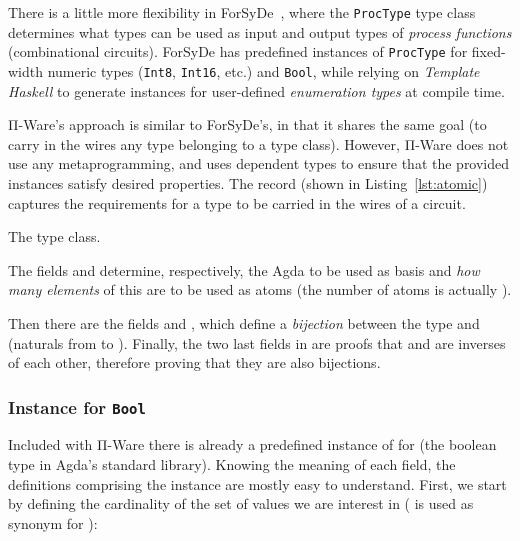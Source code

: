             There is a little more flexibility in ForSyDe~\cite{forsyde1999},
            where the \texttt{ProcType} type class determines what types can be used
            as input and output types of \emph{process functions} (combinational circuits).
            ForSyDe has predefined instances of \texttt{ProcType} for fixed-width numeric types
            (\texttt{Int8}, \texttt{Int16}, etc.) and \texttt{Bool},
            while relying on \emph{Template Haskell} to generate instances for user-defined \emph{enumeration types}
            at compile time.

            Π-Ware's approach is similar to ForSyDe's, in that it shares the same goal
            (to carry in the wires any type belonging to a type class).
            However, Π-Ware does not use any metaprogramming, and uses dependent types
            to ensure that the provided instances satisfy desired properties.
            The  record (shown in Listing~\ref{lst:atomic})
            captures the requirements for a type to be carried in the wires of a circuit.

            \begin{listing}[h]
                \caption{The  type class.\label{lst:atomic}}
            \end{listing}

            The fields  and  determine, respectively,
            the Agda  to be used as basis and \emph{how many elements} of this 
            are to be used as atoms (the number of atoms is actually  \AY{=}  ).

            Then there are the fields  and , which define a \emph{bijection}
            between the  type and   (naturals from  to ).
            Finally, the two last fields in  are proofs
            that  and  are inverses of each other,
            therefore proving that they are also bijections.

            \subsubsection{Instance for \texttt{Bool}}
            Included with Π-Ware there is already a predefined instance of  for 
            (the boolean type in Agda's standard library).
            Knowing the meaning of each field, the definitions comprising the instance
            are mostly easy to understand.
            First, we start by defining the cardinality of the set of values we are interest in
            ( is used as synonym for ):

